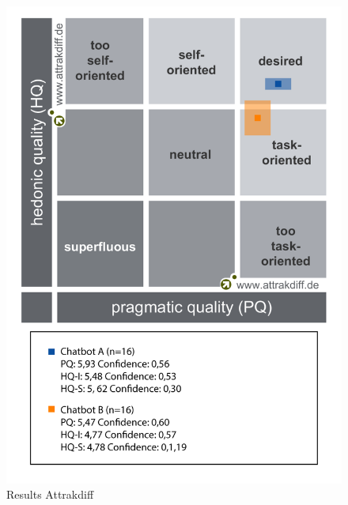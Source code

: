 \begin{figure}[h]
    \centering
    \includegraphics[scale=0.4]{figures/Portfolio-of-results-attrakdiff.png}
    \caption{Results Attrakdiff}
    \label{fig:portres}
\end{figure}
        
